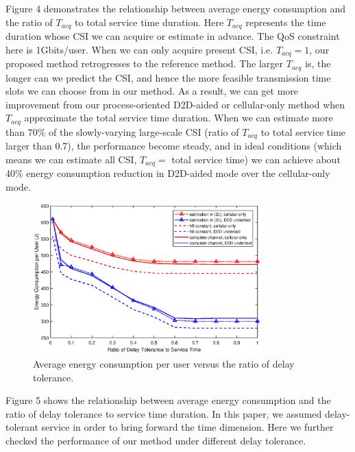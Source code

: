 \documentclass{ieeeaccess}
\begin{document}



Figure 4 demonstrates the relationship between average energy consumption and the ratio of ${T_{acq}}$ to total service time duration. Here ${T_{acq}}$ represents the time duration whose CSI we can acquire or estimate in advance. The QoS constraint here is 1Gbits/user. 
When we can only acquire present CSI, i.e. ${T_{acq}} = 1$, our proposed method retrogresses to the reference method. The larger ${T_{acq}}$ is, the longer can we predict the CSI, and hence the more feasible transmission time slots we can choose from in our method. As a result, we can get more improvement from our process-oriented D2D-aided or cellular-only method when ${T_{acq}}$ approximate the total service time duration. When we can estimate more than 70\% of the slowly-varying large-scale CSI (ratio of ${T_{acq}}$ to total service time larger than 0.7), the performance become steady, and in ideal conditions (which means we can estimate all CSI, ${T_{acq}}=$ total service time) we can achieve about 40\% energy consumption reduction in D2D-aided mode over the cellular-only mode.


\begin{figure} [htb]
\includegraphics*[width=8.8cm]{delays.eps}
\caption{Average energy consumption per user versus the ratio of delay tolerance.} \label{fig:5}
\end{figure}

Figure 5 shows the relationship between average energy consumption and the ratio of delay tolerance to service time duration. In this paper, we assumed delay-tolerant service in order to bring forward the time dimension. Here we further checked the performance of our method under different delay tolerance.
\end{document}
